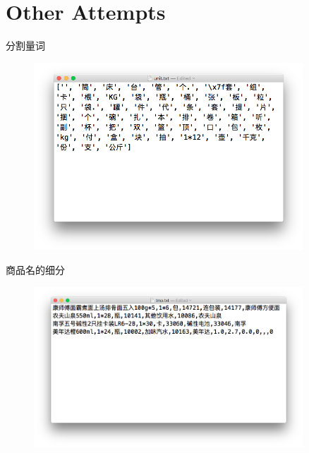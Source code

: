 \documentclass{beamer}
\begin{document}
  \section{Other Attempts}
  \begin{frame}{分割量词}
    \begin{figure}
      \centering
      \includegraphics[width=0.9\textwidth]{Nov-16/fig5.png}
    \end{figure}
  \end{frame}
  \begin{frame}{商品名的细分}
    \begin{figure}
      \centering
      \includegraphics[width=0.9\textwidth]{Nov-16/fig6.png}
    \end{figure}
  \end{frame}
\end{document}
